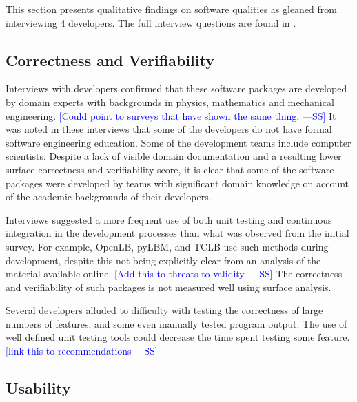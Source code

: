 \documentclass[final, 3p, times, authoryear]{elsarticle}
\newcommand{\authornote}[3]{\textcolor{#1}{[#3 ---#2]}}
\newcommand{\authornote}[3]{}
\newcommand{\wss}[1]{\authornote{blue}{SS}{#1}} %
\begin{document}
This section presents qualitative findings on software qualities as gleaned from
interviewing 4 developers. The full interview questions are found in
\citet{SmithEtAl2021}.

\subsection{Correctness and Verifiability}

Interviews with developers confirmed that these software packages are developed
by domain experts with backgrounds in physics, mathematics and mechanical
engineering. \wss{Could point to surveys that have shown the same thing.}  It
was noted in these interviews that some of the developers do not have formal
software engineering education. Some of the development teams include computer
scientists. Despite a lack of visible domain documentation and a resulting lower
surface correctness and verifiability score, it is clear that some of the
software packages were developed by teams with significant domain knowledge on
account of the academic backgrounds of their developers. 

Interviews suggested a more frequent use of both unit testing and continuous
integration in the development processes than what was observed from the initial
survey. For example, OpenLB, pyLBM, and TCLB use such methods during development,
despite this not being explicitly clear from an analysis of the material
available online. \wss{Add this to threats to validity.}  The correctness and
verifiability of such packages is not measured well using surface analysis.

Several developers alluded to difficulty with testing the correctness of large
numbers of features, and some even manually tested program output. The use of
well defined unit testing tools could decrease the time spent testing some
feature.  \wss{link this to recommendations}

\subsection{Usability}
\end{document}
